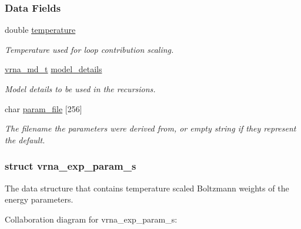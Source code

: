 \subsubsection*{Data Fields}
\begin{DoxyCompactItemize}
\item 
\mbox{\label{group__energy__parameters_aeed2cd83713012bcb52e431041e037c8}} 
double \mbox{\hyperlink{group__energy__parameters_aeed2cd83713012bcb52e431041e037c8}{temperature}}
\begin{DoxyCompactList}\small\item\em Temperature used for loop contribution scaling. \end{DoxyCompactList}\item 
\mbox{\label{group__energy__parameters_a7b84353eb9075c595bad4ceb871bcae7}} 
\mbox{\hyperlink{group__model__details_ga1f8a10e12a0a1915f2a4eff0b28ea17c}{vrna\+\_\+md\+\_\+t}} \mbox{\hyperlink{group__energy__parameters_a7b84353eb9075c595bad4ceb871bcae7}{model\+\_\+details}}
\begin{DoxyCompactList}\small\item\em Model details to be used in the recursions. \end{DoxyCompactList}\item 
\mbox{\label{group__energy__parameters_ace10aa4aacffcbf6de92349f2ee0d66a}} 
char \mbox{\hyperlink{group__energy__parameters_ace10aa4aacffcbf6de92349f2ee0d66a}{param\+\_\+file}} \mbox{[}256\mbox{]}
\begin{DoxyCompactList}\small\item\em The filename the parameters were derived from, or empty string if they represent the default. \end{DoxyCompactList}\end{DoxyCompactItemize}
\label{structvrna__exp__param__s}
\subsubsection{struct vrna\+\_\+exp\+\_\+param\+\_\+s}
The data structure that contains temperature scaled Boltzmann weights of the energy parameters. 

Collaboration diagram for vrna\+\_\+exp\+\_\+param\+\_\+s\+:
